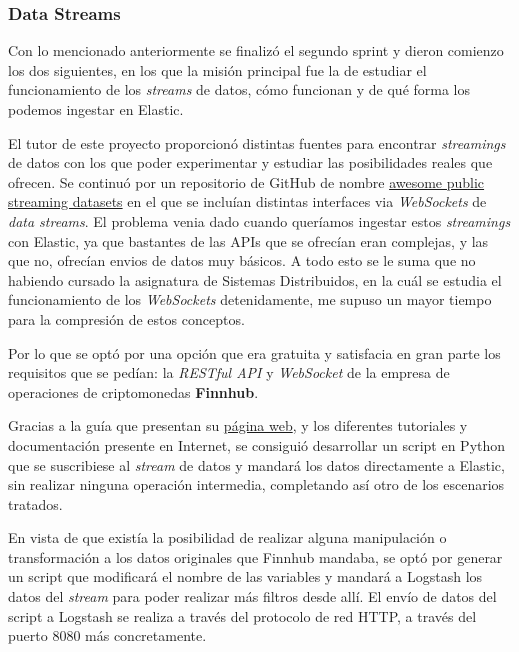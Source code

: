 \subsubsection{Data Streams}

Con lo mencionado anteriormente se finalizó el segundo sprint y dieron comienzo los dos siguientes, en los que la misión principal fue la de estudiar el funcionamiento de los \textit{streams} de datos, cómo funcionan y de qué forma los podemos ingestar en Elastic.

El tutor de este proyecto proporcionó distintas fuentes para encontrar \textit{streamings} de datos con los que poder experimentar y estudiar las posibilidades reales que ofrecen. Se continuó por un repositorio de GitHub de nombre \href{https://github.com/ColinEberhardt/awesome-public-streaming-datasets}{awesome public streaming datasets} en el que se incluían distintas interfaces via \textit{WebSockets} de \textit{data streams}. El problema venia dado cuando queríamos ingestar estos \textit{streamings} con Elastic, ya que bastantes de las APIs que se ofrecían eran complejas, y las que no, ofrecían envios de datos muy básicos. A todo esto se le suma que no habiendo cursado la asignatura de Sistemas Distribuidos, en la cuál se estudia el funcionamiento de los \textit{WebSockets} detenidamente, me supuso un mayor tiempo para la compresión de estos conceptos.

Por lo que se optó por una opción que era gratuita y satisfacia en gran parte los requisitos que se pedían: la \textit{RESTful API} y \textit{WebSocket} de la empresa de operaciones de criptomonedas \textbf{Finnhub}.

Gracias a la guía que presentan su \href{https://finnhub.io/docs/api/websocket-trades}{página web}, y los diferentes tutoriales y documentación presente en Internet, se consiguió desarrollar un script en Python que se suscribiese al \textit{stream} de datos y mandará los datos directamente a Elastic, sin realizar ninguna operación intermedia, completando así otro de los escenarios tratados.

En vista de que existía la posibilidad de realizar alguna manipulación o transformación a los datos originales que Finnhub mandaba, se optó por generar un script que modificará el nombre de las variables y mandará a Logstash los datos del \textit{stream} para poder realizar más filtros desde allí. El envío de datos del script a Logstash se realiza a través del protocolo de red HTTP, a través del puerto 8080 más concretamente.

